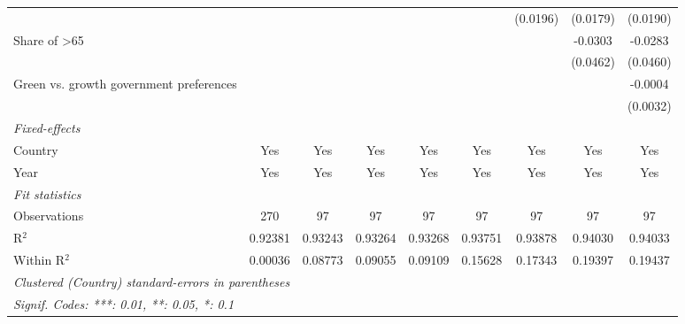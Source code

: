 \begin{table}[htbp]
\begin{tabular}{lcccccccc}
                                                             &          &          &          &          &          & (0.0196) & (0.0179) & (0.0190)\\   
      Share of >65                                           &          &          &          &          &          &          & -0.0303  & -0.0283\\   
                                                             &          &          &          &          &          &          & (0.0462) & (0.0460)\\   
      Green vs. growth government preferences                &          &          &          &          &          &          &          & -0.0004\\   
                                                             &          &          &          &          &          &          &          & (0.0032)\\   
      \midrule
      \emph{Fixed-effects}\\
      Country                                                & Yes      & Yes      & Yes      & Yes      & Yes      & Yes      & Yes      & Yes\\  
      Year                                                   & Yes      & Yes      & Yes      & Yes      & Yes      & Yes      & Yes      & Yes\\  
      \midrule
      \emph{Fit statistics}\\
      Observations                                           & 270      & 97       & 97       & 97       & 97       & 97       & 97       & 97\\  
      R$^2$                                                  & 0.92381  & 0.93243  & 0.93264  & 0.93268  & 0.93751  & 0.93878  & 0.94030  & 0.94033\\  
      Within R$^2$                                           & 0.00036  & 0.08773  & 0.09055  & 0.09109  & 0.15628  & 0.17343  & 0.19397  & 0.19437\\  
      \midrule \midrule
      \multicolumn{9}{l}{\emph{Clustered (Country) standard-errors in parentheses}}\\
      \multicolumn{9}{l}{\emph{Signif. Codes: ***: 0.01, **: 0.05, *: 0.1}}\\
   \end{tabular}
\end{table}


